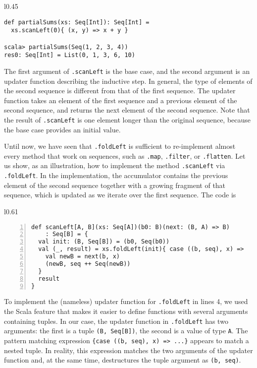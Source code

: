 \begin{wrapfigure}{l}{0.45\columnwidth}%
\vspace{0\baselineskip}
\begin{lstlisting}
def partialSums(xs: Seq[Int]): Seq[Int] =
  xs.scanLeft(0){ (x, y) => x + y }

scala> partialSums(Seq(1, 2, 3, 4))
res0: Seq[Int] = List(0, 1, 3, 6, 10)
\end{lstlisting}

\vspace{-1.5\baselineskip}
\end{wrapfigure}%

\noindent The first argument of \lstinline!.scanLeft! is the base
case, and the second argument is an updater function describing the
inductive step. In general, the type of elements of the second sequence
is different from that of the first sequence. The updater function
takes an element of the first sequence and a previous element of the
second sequence, and returns the next element of the second sequence.
Note that the result of \lstinline!.scanLeft! is one element longer
than the original sequence, because the base case provides an initial
value.

Until now, we have seen that \lstinline!.foldLeft! is sufficient
to re-implement almost every method that work on sequences, such as
\lstinline!.map!, \lstinline!.filter!, or \lstinline!.flatten!.
Let us show, as an illustration, how to implement the method \lstinline!.scanLeft!
via \lstinline!.foldLeft!. In the implementation, the accumulator
contains the previous element of the second sequence together with
a growing fragment of that sequence, which is updated as we iterate
over the first sequence. The code is

\begin{wrapfigure}{l}{0.61\columnwidth}%
\vspace{-0.95\baselineskip}
\begin{lstlisting}[numbers=left,numberstyle={\small}]
def scanLeft[A, B](xs: Seq[A])(b0: B)(next: (B, A) => B)
    : Seq[B] = {
  val init: (B, Seq[B]) = (b0, Seq(b0))
  val (_, result) = xs.foldLeft(init){ case ((b, seq), x) =>
    val newB = next(b, x)
    (newB, seq ++ Seq(newB))
  }
  result
}
\end{lstlisting}

\vspace{-1.2\baselineskip}
\end{wrapfigure}%

\noindent To implement the (nameless) updater function for \lstinline!.foldLeft!
in lines 4, we used the Scala feature that makes it easier
to define functions with several arguments containing tuples. In our
case, the updater function in \lstinline!.foldLeft! has two arguments:
the first is a tuple \lstinline!(B, Seq[B])!, the second is a value
of type \lstinline!A!. The pattern matching expression \lstinline!{case ((b, seq), x) => ...}!
appears to match a nested tuple. In reality,
this expression matches the two arguments of the updater function
and, at the same time, destructures the tuple argument as \lstinline!(b, seq)!. 

